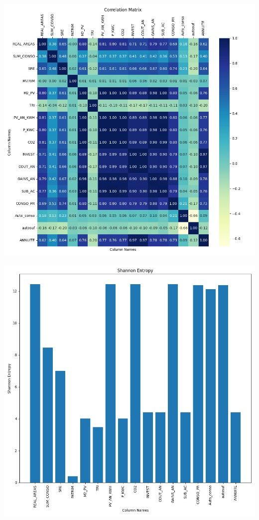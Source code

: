 \documentclass{article}
\begin{document}
\includegraphics[width=\textwidth]{figures/correlation_matrix.png}

\includegraphics[width=\textwidth]{figures/shannon_entropy.png}
\end{document}
